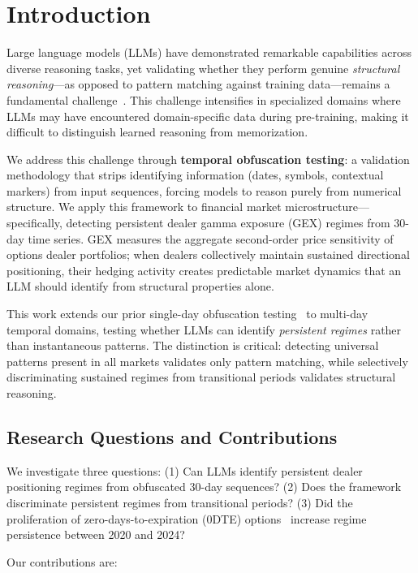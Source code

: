 \section{Introduction}

Large language models (LLMs) have demonstrated remarkable capabilities across diverse reasoning tasks, yet validating whether they perform genuine \textit{structural reasoning}---as opposed to pattern matching against training data---remains a fundamental challenge~\cite{mccoy2023embers}. This challenge intensifies in specialized domains where LLMs may have encountered domain-specific data during pre-training, making it difficult to distinguish learned reasoning from memorization.

We address this challenge through \textbf{temporal obfuscation testing}: a validation methodology that strips identifying information (dates, symbols, contextual markers) from input sequences, forcing models to reason purely from numerical structure. We apply this framework to financial market microstructure---specifically, detecting persistent dealer gamma exposure (GEX) regimes from 30-day time series. GEX measures the aggregate second-order price sensitivity of options dealer portfolios; when dealers collectively maintain sustained directional positioning, their hedging activity creates predictable market dynamics that an LLM should identify from structural properties alone.

This work extends our prior single-day obfuscation testing~\cite{regan2025obfuscation} to multi-day temporal domains, testing whether LLMs can identify \textit{persistent regimes} rather than instantaneous patterns. The distinction is critical: detecting universal patterns present in all markets validates only pattern matching, while selectively discriminating sustained regimes from transitional periods validates structural reasoning.

\subsection{Research Questions and Contributions}

We investigate three questions: (1) Can LLMs identify persistent dealer positioning regimes from obfuscated 30-day sequences? (2) Does the framework discriminate persistent regimes from transitional periods? (3) Did the proliferation of zero-days-to-expiration (0DTE) options~\cite{cboe2024zero} increase regime persistence between 2020 and 2024?

Our contributions are:

